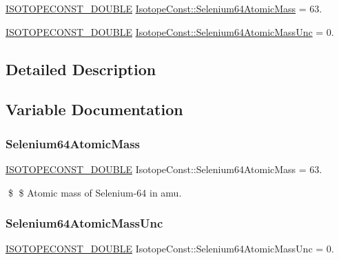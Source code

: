 \begin{DoxyCompactItemize}
\item 
\mbox{\hyperlink{group___isotope_const-_macros_ga8f45a7272ce02c0b4c65c44636ed719a}{I\+S\+O\+T\+O\+P\+E\+C\+O\+N\+S\+T\+\_\+\+D\+O\+U\+B\+LE}} \mbox{\hyperlink{group___isotope_const-_selenium-_se64_ga615449582f60a48ea8d965337a014437}{Isotope\+Const\+::\+Selenium64\+Atomic\+Mass}} = 63.
\item 
\mbox{\hyperlink{group___isotope_const-_macros_ga8f45a7272ce02c0b4c65c44636ed719a}{I\+S\+O\+T\+O\+P\+E\+C\+O\+N\+S\+T\+\_\+\+D\+O\+U\+B\+LE}} \mbox{\hyperlink{group___isotope_const-_selenium-_se64_gaac861eaa4952dd09bb8fb06ee0d8fb89}{Isotope\+Const\+::\+Selenium64\+Atomic\+Mass\+Unc}} = 0.
\end{DoxyCompactItemize}


\subsection{Detailed Description}


\subsection{Variable Documentation}
\mbox{\label{group___isotope_const-_selenium-_se64_ga615449582f60a48ea8d965337a014437}} 
\subsubsection{\texorpdfstring{Selenium64\+Atomic\+Mass}{Selenium64AtomicMass}}
{\footnotesize\ttfamily \mbox{\hyperlink{group___isotope_const-_macros_ga8f45a7272ce02c0b4c65c44636ed719a}{I\+S\+O\+T\+O\+P\+E\+C\+O\+N\+S\+T\+\_\+\+D\+O\+U\+B\+LE}} Isotope\+Const\+::\+Selenium64\+Atomic\+Mass = 63.}

\$ \$ Atomic mass of Selenium-\/64 in amu. \mbox{\label{group___isotope_const-_selenium-_se64_gaac861eaa4952dd09bb8fb06ee0d8fb89}} 
\subsubsection{\texorpdfstring{Selenium64\+Atomic\+Mass\+Unc}{Selenium64AtomicMassUnc}}
{\footnotesize\ttfamily \mbox{\hyperlink{group___isotope_const-_macros_ga8f45a7272ce02c0b4c65c44636ed719a}{I\+S\+O\+T\+O\+P\+E\+C\+O\+N\+S\+T\+\_\+\+D\+O\+U\+B\+LE}} Isotope\+Const\+::\+Selenium64\+Atomic\+Mass\+Unc = 0.}


